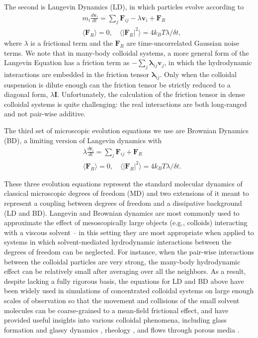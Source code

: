 \documentclass[%
reprint,
amsmath,amssymb,
aps,
]{revtex4-2}
\begin{document}
	The second is Langevin Dynamics (LD), in which particles evolve according to 
	\begin{align} \label{eq:LD}
		&m_i \frac{d\textbf{v}_i}{dt} = \sum_j\textbf{F}_{ij}-\lambda\textbf{v}_i +\textbf{F}_R\\
		&\langle\textbf{F}_R\rangle=0, \quad \langle \lvert\textbf{F}_R\rvert^2 \rangle = 4k_BT\lambda/\delta t,\nonumber
	\end{align}
	where $\lambda$ is a frictional term and the $\textbf{F}_R$ are time-uncorrelated Gaussian noise terms. We note that in many-body colloidal systems, a more general form of the Langevin Equation has a friction term as $-\sum_j \bm{\lambda}_{ij} \textbf{v}_j $, in which the hydrodynamic interactions are embedded in the friction tensor $\bm{\lambda}_{ij}$. Only when the colloidal suspension is dilute enough can the friction tensor be strictly reduced to a diagonal form, $\lambda\bm{I}$. Unfortunately, the calculation of the friction tensor in dense colloidal systems is quite challenging: the real interactions are both long-ranged and not pair-wise additive. 
 
 The third set of microscopic evolution equations we use are Brownian Dynamics (BD), a limiting version of Langevin dynamics with
	\begin{align}
		&\lambda\frac{d\textbf{r}_i}{dt} = \sum_j\textbf{F}_{ij}+\textbf{F}_R\\
		&\langle\textbf{F}_R\rangle=0, \quad \langle \lvert\textbf{F}_R\rvert^2 \rangle = 4k_BT\lambda/\delta t.\nonumber
	\end{align}
	
	These three evolution equations represent the standard molecular dynamics of classical microscopic degrees of freedom (MD) and two extensions of it meant to represent a coupling between degrees of freedom and a dissipative background (LD and BD). Langevin and Brownian dynamics are most commonly used to approximate the effect of mesoscopically large objects (e.g., colloids) interacting with a viscous solvent -- in this setting they are most appropriate when applied to systems in which solvent-mediated hydrodynamic interactions between the degrees of freedom can be neglected. For instance, when the pair-wise interactions between the colloidal particles are very strong, the many-body hydrodynamic effect can be relatively small after averaging over all the neighbors. As a result, despite lacking a fully rigorous basis, the equations for LD and BD above have been widely used in simulations of concentrated colloidal systems on large enough scales of observation so that the movement and collisions of the small solvent molecules can be coarse-grained to a mean-field frictional effect, and have provided useful insights into various colloidal phenomena, including glass formation and glassy dynamics \cite{lowen1991brownian,flenner2015fundamental}, rheology \cite{foss2000brownian,treffenstadt2020memory}, and flows through porous media \cite{chavez2008diffusion}. 
 
\end{document}

